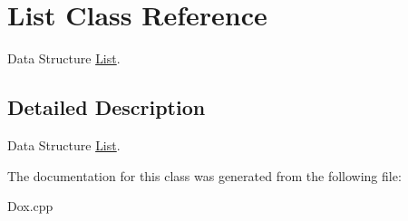 \hypertarget{classList}{}\section{List Class Reference}
\label{classList}


Data Structure \hyperlink{classList}{List}.  




\subsection{Detailed Description}
Data Structure \hyperlink{classList}{List}. 

The documentation for this class was generated from the following file\+:\begin{DoxyCompactItemize}
\item 
Dox.\+cpp\end{DoxyCompactItemize}
